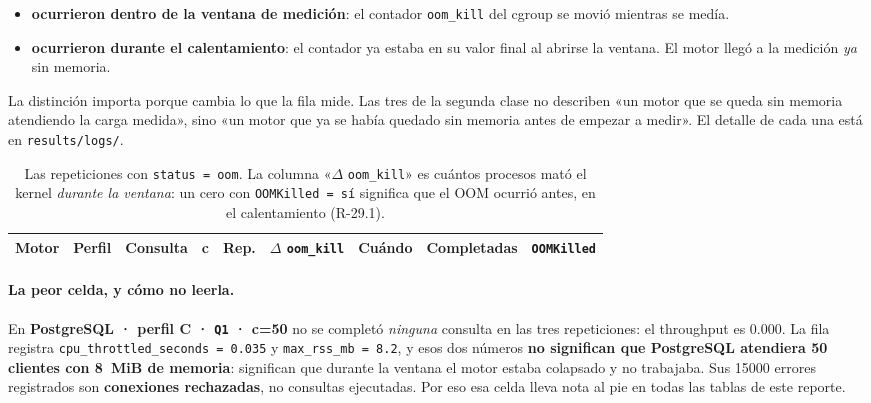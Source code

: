 \begin{itemize}
  \item \textbf{\cifraOomEnVentana{} ocurrieron dentro de la ventana de medición}:
        el contador \texttt{oom\_kill} del cgroup se movió mientras se medía.
  \item \textbf{\cifraOomEnCalentamiento{} ocurrieron durante el calentamiento}: el
        contador ya estaba en su valor final al abrirse la ventana. El motor llegó
        a la medición \emph{ya} sin memoria.
\end{itemize}

La distinción importa porque cambia lo que la fila mide. Las tres de la segunda
clase no describen «un motor que se queda sin memoria atendiendo la carga medida»,
sino «un motor que ya se había quedado sin memoria antes de empezar a medir». El
detalle de cada una está en \texttt{results/logs/}.

\begin{table}[htbp]
  \centering
  \caption{Las \cifraFilasOom{} repeticiones con \texttt{status = oom}. La columna
           «$\Delta$ \texttt{oom\_kill}» es cuántos procesos mató el kernel
           \emph{durante la ventana}: un cero con \texttt{OOMKilled = sí}
           significa que el OOM ocurrió antes, en el calentamiento (R-29.1).}
  \label{tab:oom}
  \small
  \begin{tabular}{lllrrrlrl}
    \toprule
    Motor & Perfil & Consulta & c & Rep. & $\Delta$ \texttt{oom\_kill} & Cuándo &
    Completadas & \texttt{OOMKilled} \\
    \midrule
  \end{tabular}
\end{table}

\paragraph{La peor celda, y cómo no leerla.}
En \textbf{PostgreSQL · perfil C · \texttt{Q1} · \mbox{c=50}} no se completó
\emph{ninguna} consulta en las tres repeticiones: el throughput es 0.000. La fila
registra \texttt{cpu\_throttled\_seconds = 0.035} y
\texttt{max\_rss\_mb = 8.2}\tnotaColapsada{}, y esos dos números \textbf{no
significan que PostgreSQL atendiera 50 clientes con 8~MiB de memoria}: significan
que durante la ventana el motor estaba colapsado y no trabajaba. Sus
\num{15000} errores registrados son \textbf{conexiones rechazadas}, no consultas
ejecutadas. Por eso esa celda lleva nota al pie en todas las tablas de este
reporte.

